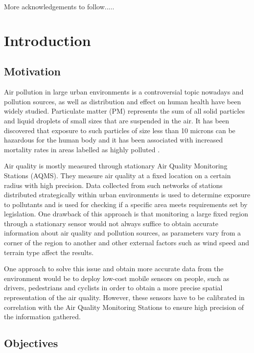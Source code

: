 \documentclass[bsc,frontabs,twoside,singlespacing,parskip,deptreport]{infthesis}     %
\begin{document}
More acknowledgements to follow.....

\tableofcontents



\chapter{Introduction}

\section{Motivation}

Air pollution in large urban environments is a controversial topic nowadays and pollution sources, as well as distribution and effect on human health have been widely studied. Particulate matter (PM) represents the sum of all solid particles and liquid droplets of small sizes that are suspended in the air. It has been discovered that exposure to such particles of size less than 10 microns can be hazardous for the human body and it has been associated with increased mortality rates in areas labelled as highly polluted \cite{Dockery1994}.

Air quality is mostly measured through stationary Air Quality Monitoring Stations (AQMS). They measure air quality at a fixed location on a certain radius with high precision. Data collected from such networks of stations distributed strategically within urban environments is used to determine exposure to pollutants and is used for checking if a specific area meets requirements set by legislation. One drawback of this approach is that monitoring a large fixed region through a stationary sensor would not always suffice to obtain accurate information about air quality and pollution sources, as parameters vary from a corner of the region to another and other external factors such as wind speed and terrain type affect the results.

One approach to solve this issue and obtain more accurate data from the environment would be to deploy low-cost mobile sensors on people, such as drivers, pedestrians and cyclists in order to obtain a more precise spatial representation of the air quality. However, these sensors have to be calibrated in correlation with the Air Quality Monitoring Stations to ensure high precision of the information gathered.

\section{Objectives}
\end{document}
